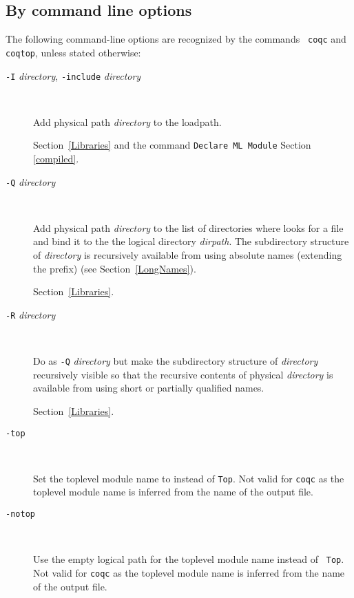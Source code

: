 \subsection{By command line options
\label{coqoptions}}

The following command-line options are recognized by the commands {\tt
  coqc} and {\tt coqtop}, unless stated otherwise:

\begin{description}
\item[{\tt -I} {\em directory}, {\tt -include} {\em directory}]\ %

  Add physical path {\em directory} to the {\ocaml} loadpath.

  \SeeAlso Section~\ref{Libraries} and the command {\tt Declare ML Module} Section \ref{compiled}.

\item[{\tt -Q} {\em directory} {\dirpath}]\ %

  Add physical path \emph{directory} to the list of directories where
  {\Coq} looks for a file and bind it to the the logical directory
  \emph{dirpath}. The subdirectory structure of \emph{directory} is
  recursively available from {\Coq} using absolute names (extending
  the {\dirpath} prefix) (see Section~\ref{LongNames}).

  \SeeAlso Section~\ref{Libraries}.

\item[{\tt -R} {\em directory} {\dirpath}]\ %

  Do as \texttt{-Q} \emph{directory} {\dirpath} but make the
  subdirectory structure of \emph{directory} recursively visible so
  that the recursive contents of physical \emph{directory} is available
  from {\Coq} using short or partially qualified names.

  \SeeAlso Section~\ref{Libraries}.

\item[{\tt -top} {\dirpath}]\ %

  Set the toplevel module name to {\dirpath} instead of {\tt Top}. Not
  valid for {\tt coqc} as the toplevel module name is inferred from the
  name of the output file.

\item[{\tt -notop}]\ %

  Use the empty logical path for the toplevel module name instead of {\tt
    Top}. Not valid for {\tt coqc} as the toplevel module name is
  inferred from the name of the output file.


\end{description}
